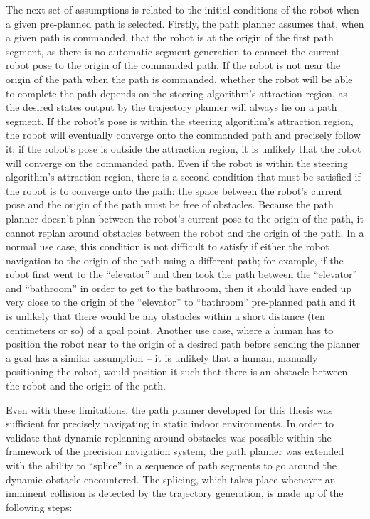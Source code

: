 The next set of assumptions is related to the initial conditions of the robot when a given pre-planned path is selected. Firstly, the path planner assumes that, when a given path is commanded, that the robot is at the origin of the first path segment, as there is no automatic segment generation to connect the current robot pose to the origin of the commanded path. If the robot is not near the origin of the path when the path is commanded, whether the robot will be able to complete the path depends on the steering algorithm's attraction region, as the desired states output by the trajectory planner will always lie on a path segment. If the robot's pose is within the steering algorithm's attraction region, the robot will eventually converge onto the commanded path and precisely follow it; if the robot's pose is outside the attraction region, it is unlikely that the robot will converge on the commanded path. Even if the robot is within the steering algorithm's attraction region, there is a second condition that must be satisfied if the robot is to converge onto the path: the space between the robot's current pose and the origin of the path must be free of obstacles. Because the path planner doesn't plan between the robot's current pose to the origin of the path, it cannot replan around obstacles between the robot and the origin of the path. In a normal use case, this condition is not difficult to satisfy if either the robot navigation to the origin of the path using a different path; for example, if the robot first went to the ``elevator'' and then took the path between the ``elevator'' and ``bathroom'' in order to get to the bathroom, then it should have ended up very close to the origin of the ``elevator'' to ``bathroom'' pre-planned path and it is unlikely that there would be any obstacles within a short distance (ten centimeters or so) of a goal point. Another use case, where a human has to position the robot near to the origin of a desired path before sending the planner a goal has a similar assumption -- it is unlikely that a human, manually positioning the robot, would position it such that there is an obstacle between the robot and the origin of the path.

Even with these limitations, the path planner developed for this thesis was sufficient for precisely navigating in static indoor environments. In order to validate that dynamic replanning around obstacles was possible within the framework of the precision navigation system, the path planner was extended with the ability to ``splice'' in a sequence of path segments to go around the dynamic obstacle encountered. The splicing, which takes place whenever an imminent collision is detected by the trajectory generation, is made up of the following steps:

